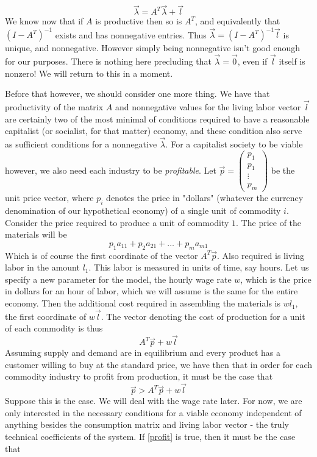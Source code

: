 \documentclass{article}
\theoremstyle{definition}
\theoremstyle{plain}
\theoremstyle{theorem}
\begin{document}
 \[ \vec{\lambda} = A^T\vec{\lambda} + \vec{l} \]
 We know now that if $A$ is productive then so is $A^T$, and equivalently that $(I-A^T)^{-1}$ exists and has nonnegative entries. Thus $\vec{\lambda} = (I-A^T)^{-1}\vec{l}$ is unique, and nonnegative. However simply being nonnegative isn't good enough for our purposes. There is nothing here precluding that $\vec{\lambda} = \vec{0}$, even if $\vec{l}$ itself is nonzero! We will return to this in a moment. \par 
 Before that however, we should consider one more thing. We have that productivity of the matrix $A$ and nonnegative values for the living labor vector $\vec{l}$ are certainly two of the most minimal of conditions required to have a reasonable capitalist (or socialist, for that matter) economy, and these condition also serve as sufficient conditions for a nonnegative $\vec{\lambda}$. For a capitalist society to be viable however, we also need each industry to be \textit{profitable}. Let $\vec{p} = \begin{pmatrix} p_1 \\ p_1 \\ \vdots \\ p_m  \end{pmatrix}$ be the unit price vector, where $p_i$ denotes the price in "dollars" (whatever the currency denomination of our hypothetical economy) of a single unit of commodity $i$. Consider the price required to produce a unit of commodity $1$. The price of the materials will be
\[ p_1a_{11} + p_2a_{21} + \ldots + p_ma_{m1} \]
Which is of course the first coordinate of the vector $A^T\vec{p}$. Also required is living labor in the amount $l_1$. This labor is measured in units of time, say hours. Let us specify a new parameter for the model, the hourly wage rate $w$, which is the price in dollars for an hour of labor, which we will assume is the same for the entire economy. Then the additional cost required in assembling the materials is $wl_1$, the first coordinate of $w\vec{l}$. The vector denoting the cost of production for a unit of each commodity is thus
\[ A^T\vec{p} + w\vec{l} \]
Assuming supply and demand are in equilibrium and every product has a customer willing to buy at the standard price, we have then that in order for each commodity industry to profit from production, it must be the case that
\[ \vec{p} > A^T\vec{p} + w\vec{l} \label{profit} \]
Suppose this is the case. We will deal with the wage rate later. For now, we are only interested in the necessary conditions for a viable economy independent of anything besides the consumption matrix and living labor vector - the truly technical coefficients of the system. If \ref{profit} is true, then it must be the case that
\end{document}
